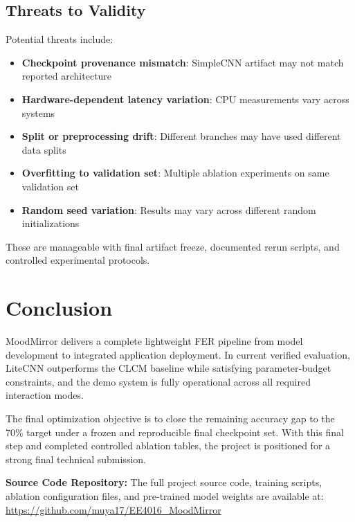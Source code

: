 \documentclass[12pt,a4paper]{article}
\begin{document}
\subsection{Threats to Validity}
Potential threats include:
\begin{itemize}[leftmargin=*]
    \item \textbf{Checkpoint provenance mismatch}: SimpleCNN artifact may not match reported architecture
    \item \textbf{Hardware-dependent latency variation}: CPU measurements vary across systems
    \item \textbf{Split or preprocessing drift}: Different branches may have used different data splits
    \item \textbf{Overfitting to validation set}: Multiple ablation experiments on same validation set
    \item \textbf{Random seed variation}: Results may vary across different random initializations
\end{itemize}
These are manageable with final artifact freeze, documented rerun scripts, and controlled experimental protocols.

\section{Conclusion}
MoodMirror delivers a complete lightweight FER pipeline from model development to integrated application deployment. In current verified evaluation, LiteCNN outperforms the CLCM baseline while satisfying parameter-budget constraints, and the demo system is fully operational across all required interaction modes.

The final optimization objective is to close the remaining accuracy gap to the 70\% target under a frozen and reproducible final checkpoint set. With this final step and completed controlled ablation tables, the project is positioned for a strong final technical submission.

\medskip
\noindent\textbf{Source Code Repository:} The full project source code, training scripts, ablation configuration files, and pre-trained model weights are available at: \url{https://github.com/muya17/EE4016_MoodMirror}
\end{document}
